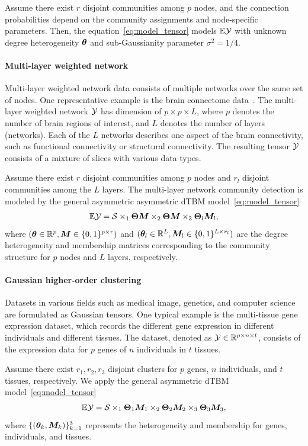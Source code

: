 \documentclass[journal]{IEEEtran}
\theoremstyle{definition}
\theoremstyle{definition}
\begin{document}
Assume there exist $r$ disjoint communities among $p$ nodes, and the connection probabilities depend on the community assignments and node-specific parameters. 
Then, the equation~\eqref{eq:model_tensor} models $\mathbb{E} \mathcal{Y}$ with unknown degree heterogeneity $\boldsymbol{\theta}$ and sub-Gaussianity parameter $\sigma^2 = 1/4$.

\paragraph{Multi-layer weighted network} 
Multi-layer weighted network data consists of multiple networks over the same set of nodes. One representative example is the brain connectome data~\citep{zhang2019tensor}. The multi-layer weighted network $\mathcal{Y}$ has dimension of $p \times p \times L$, where $p$ denotes the number of brain regions of interest, and $L$ denotes the number of layers (networks). Each of the $L$ networks describes one aspect of the brain connectivity, such as functional connectivity or structural connectivity. The resulting tensor $\mathcal{Y}$ consists of a mixture of slices with various data types. 


Assume there exist $r$ disjoint communities among $p$ nodes and $r_l$ disjoint communities among the $L$ layers. The multi-layer network community detection is modeled by the general asymmetric asymmetric dTBM model~\eqref{eq:model_tensor}
\begin{equation}
    \mathbb{E} \mathcal{Y} = \mathcal{S} \times_1 \boldsymbol{\Theta} \bm M \times_2 \boldsymbol{\Theta} \bm M \times_3 \boldsymbol{\Theta}_l \bm M_l, 
\end{equation}
where $(\boldsymbol{\theta} \in \mathbb{R}^p, \bm M \in \{0,1\}^{p \times r})$ and $ (\boldsymbol{\theta}_l \in \mathbb{R}^L, \bm M_l \in \{0,1\}^{L \times r_l})$ are the degree heterogeneity and membership matrices corresponding to the community structure for $p$ nodes and $L$ layers, respectively. 

\paragraph{Gaussian higher-order clustering} Datasets in various fields such as medical image, genetics, and computer science are formulated as Gaussian tensors. One typical example is the multi-tissue gene expression dataset, which records the different gene expression in different individuals and different tissues. The dataset, denoted as $\mathcal{Y} \in \mathbb{R}^{p \times n \times t}$, consists of the expression data for $p$ genes of $n$ individuals in $t$ tissues. 

Assume there exist $r_1, r_2, r_3$ disjoint clusters for $p$ genes, $n$ individuals, and $t$ tissues, respectively. We apply the general asymmetric dTBM model~\eqref{eq:model_tensor} 
\begin{equation}
    \mathbb{E}\mathcal{Y} = \mathcal{S} \times_1 \boldsymbol{\Theta}_1 \bm M_1 \times_2 \boldsymbol{\Theta}_2 \bm M_2 \times_3 \boldsymbol{\Theta}_3 \bm M_3, 
\end{equation}
where $\{(\boldsymbol{\theta}_k, \bm M_k)\}_{k=1}^3$ represents the heterogeneity and membership for genes, individuals, and tissues. 
\end{document}
